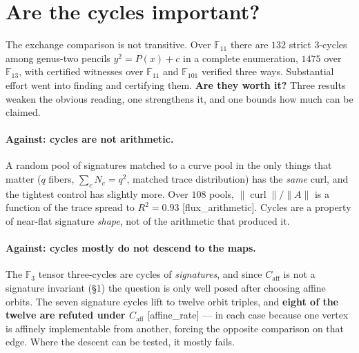 \documentclass[11pt]{article}
\theoremstyle{plain}
\theoremstyle{remark}
\newcommand{\F}{\mathbb F}
\newcommand{\caff}{C_{\mathrm{aff}}}
\newcommand{\source}[1]{{\normalfont\small\textsf{[#1]}}}
\begin{document}
\section{Are the cycles important?}

The exchange comparison is not transitive.  Over $\F_{11}$ there are $132$
strict $3$-cycles among genus-two pencils $y^2 = P(x)+c$ in a complete
enumeration, $1475$ over $\F_{13}$, with certified witnesses over $\F_{11}$ and
$\F_{101}$ verified three ways.  Substantial effort went into finding and
certifying them.  \textbf{Are they worth it?}  Three results weaken the obvious
reading, one strengthens it, and one bounds how much can be claimed.

\paragraph{Against: cycles are not arithmetic.}
A random pool of signatures matched to a curve pool in the only things that
matter ($q$ fibers, $\sum_c N_c = q^2$, matched trace distribution) has the
\emph{same} curl, and the tightest control has slightly more.  Over $108$ pools,
$\lVert\operatorname{curl}\rVert/\lVert A\rVert$ is a function of the trace
spread to $R^2 = 0.93$ \source{flux\_arithmetic}.  Cycles are a property of
near-flat signature \emph{shape}, not of the arithmetic that produced it.

\paragraph{Against: cycles mostly do not descend to the maps.}
The $\F_3$ tensor three-cycles are cycles of \emph{signatures}, and since
$\caff$ is not a signature invariant (\S1) the question is only well posed after
choosing affine orbits.  The seven signature cycles lift to twelve orbit
triples, and \textbf{eight of the twelve are refuted under $\caff$}
\source{affine\_rate} --- in each case because one vertex is affinely
implementable from another, forcing the opposite comparison on that edge.  Where
the descent can be tested, it mostly fails.
\end{document}
